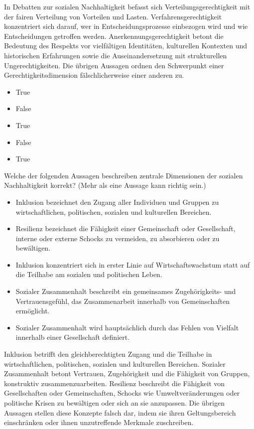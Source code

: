 \documentclass[
  nswissgerman,
  a4paper,
  DIV=11,
  numbers=noendperiod,
  oneside,
  openany]{scrreprt}
\providecommand{\tightlist}{%
  \setlength{\itemsep}{0pt}\setlength{\parskip}{0pt}}
\begin{document}
In Debatten zur sozialen Nachhaltigkeit befasst sich
Verteilungsgerechtigkeit mit der fairen Verteilung von Vorteilen und
Lasten. Verfahrensgerechtigkeit konzentriert sich darauf, wer in
Entscheidungsprozesse einbezogen wird und wie Entscheidungen getroffen
werden. Anerkennungsgerechtigkeit betont die Bedeutung des Respekts vor
vielfältigen Identitäten, kulturellen Kontexten und historischen
Erfahrungen sowie die Auseinandersetzung mit strukturellen
Ungerechtigkeiten. Die übrigen Aussagen ordnen den Schwerpunkt einer
Gerechtigkeitsdimension fälschlicherweise einer anderen zu.

\begin{itemize}
\tightlist
\item
  True
\item
  False
\item
  True
\item
  False
\item
  True
\end{itemize}

Welche der folgenden Aussagen beschreiben zentrale Dimensionen der
sozialen Nachhaltigkeit korrekt? (Mehr als eine Aussage kann richtig
sein.)

\begin{itemize}
\tightlist
\item[$\square$]
  Inklusion bezeichnet den Zugang aller Individuen und Gruppen zu
  wirtschaftlichen, politischen, sozialen und kulturellen Bereichen.
\item[$\square$]
  Resilienz bezeichnet die Fähigkeit einer Gemeinschaft oder
  Gesellschaft, interne oder externe Schocks zu vermeiden, zu
  absorbieren oder zu bewältigen.
\item[$\square$]
  Inklusion konzentriert sich in erster Linie auf Wirtschaftswachstum
  statt auf die Teilhabe am sozialen und politischen Leben.
\item[$\square$]
  Sozialer Zusammenhalt beschreibt ein gemeinsames Zugehörigkeits- und
  Vertrauensgefühl, das Zusammenarbeit innerhalb von Gemeinschaften
  ermöglicht.
\item[$\square$]
  Sozialer Zusammenhalt wird hauptsächlich durch das Fehlen von Vielfalt
  innerhalb einer Gesellschaft definiert.
\end{itemize}

Inklusion betrifft den gleichberechtigten Zugang und die Teilhabe in
wirtschaftlichen, politischen, sozialen und kulturellen Bereichen.
Sozialer Zusammenhalt betont Vertrauen, Zugehörigkeit und die Fähigkeit
von Gruppen, konstruktiv zusammenzuarbeiten. Resilienz beschreibt die
Fähigkeit von Gesellschaften oder Gemeinschaften, Schocks wie
Umweltveränderungen oder politische Krisen zu bewältigen oder sich an
sie anzupassen. Die übrigen Aussagen stellen diese Konzepte falsch dar,
indem sie ihren Geltungsbereich einschränken oder ihnen unzutreffende
Merkmale zuschreiben.
\end{document}
